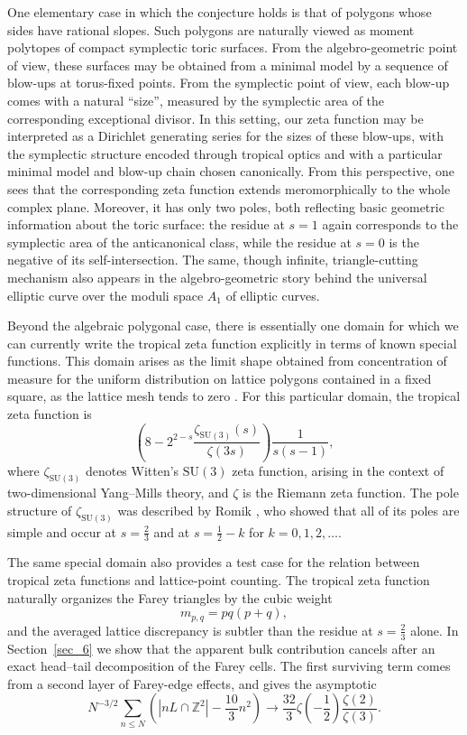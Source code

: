 \documentclass[a4paper,american,11pt]{amsart}
\theoremstyle{plain}
\theoremstyle{definition}
\newcommand{\Z}{\mathbb Z}
\begin{document}
One elementary case in which the conjecture holds is that of polygons whose
sides have rational slopes. Such polygons are naturally viewed as moment
polytopes of compact symplectic toric surfaces. From the algebro-geometric
point of view, these surfaces may be obtained from a minimal model by a
sequence of blow-ups at torus-fixed points. From the symplectic point of view,
each blow-up comes with a natural ``size'', measured by the symplectic area of
the corresponding exceptional divisor. In this setting, our zeta function may
be interpreted as a Dirichlet generating series for the sizes of these
blow-ups, with the symplectic structure encoded through tropical optics and
with a particular minimal model and blow-up chain chosen canonically. From
this perspective, one sees that the corresponding zeta function extends
meromorphically to the whole complex plane. Moreover, it has only two poles,
both reflecting basic geometric information about the toric surface: the
residue at \(s=1\) again corresponds to the symplectic area of the
anticanonical class, while the residue at \(s=0\) is the negative of its
self-intersection. The same, though infinite, triangle-cutting mechanism also
appears in the algebro-geometric story
\cite{KramerPippich2015Snapshot,BurgosGilKramerKuehn2016} behind the
universal elliptic curve over the moduli space \(A_1\) of elliptic curves.

Beyond the algebraic polygonal case, there is essentially one domain for which
we can currently write the tropical zeta function explicitly in terms of known
special functions. This domain arises as the limit shape obtained from
concentration of measure for the uniform distribution on lattice polygons
contained in a fixed square, as the lattice mesh tends to zero
\cite{Vershik1994,Barany1995,Barany2008}. For this particular domain, the
tropical zeta function is
\[
\left(8-2^{2-s}\frac{\zeta_{\mathrm{SU}(3)}(s)}{\zeta(3s)}\right)
\frac{1}{s(s-1)},
\]
where \(\zeta_{\mathrm{SU}(3)}\) denotes Witten's \(\mathrm{SU}(3)\) zeta
function, arising in the context of two-dimensional Yang--Mills theory, and
\(\zeta\) is the Riemann zeta function. The pole structure of
\(\zeta_{\mathrm{SU}(3)}\) was described by Romik \cite{Romik2017}, who
showed that all of its poles are simple and occur at \(s=\frac23\) and at
\(s=\frac12-k\) for \(k=0,1,2,\dots\).

The same special domain also provides a test case for the relation between
tropical zeta functions and lattice-point counting. The tropical zeta function
naturally organizes the Farey triangles by the cubic weight
\[
m_{p,q}=pq(p+q),
\]
and the averaged lattice discrepancy is subtler than the residue at
\(s=\frac23\) alone. In Section~\ref{sec_6} we show that the apparent bulk
contribution cancels after an exact head--tail decomposition of the Farey
cells. The first surviving term comes from a second layer of Farey-edge
effects, and gives the asymptotic
\[
N^{-3/2}\sum_{n\le N}
\left(|nL\cap\Z^2|-\frac{10}{3}n^2\right)
\longrightarrow
\frac{32}{3}\zeta\!\left(-\frac12\right)
\frac{\zeta(2)}{\zeta(3)}.
\]
\end{document}
